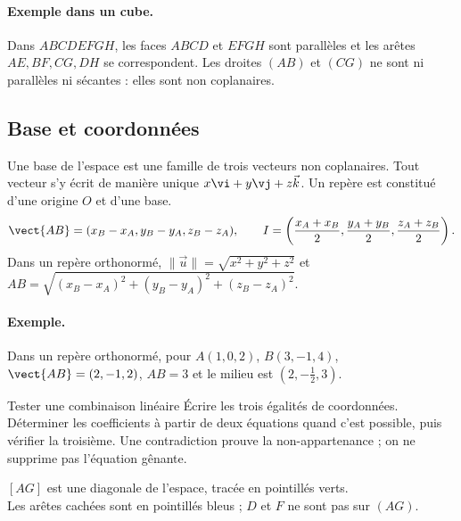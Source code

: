 \paragraph{Exemple dans un cube.} Dans $ABCDEFGH$, les faces $ABCD$ et $EFGH$ sont parallèles et les arêtes $AE,BF,CG,DH$ se correspondent. Les droites $(AB)$ et $(CG)$ ne sont ni parallèles ni sécantes : elles sont non coplanaires.
\subsection{Base et coordonnées}
Une base de l'espace est une famille de trois vecteurs non coplanaires. Tout vecteur s'y écrit de manière unique $x\vi +y\vj +z\vec k$. Un repère est constitué d'une origine $O$ et d'une base.
\[\vect{AB}=(x_B-x_A,y_B-y_A,z_B-z_A),\qquad
I=\left(\frac{x_A+x_B}2,\frac{y_A+y_B}2,\frac{z_A+z_B}2\right).\]
Dans un repère orthonormé, $\|\vec u\|=\sqrt{x^2+y^2+z^2}$ et $AB=\sqrt{(x_B-x_A)^2+(y_B-y_A)^2+(z_B-z_A)^2}$.
\paragraph{Exemple.} Dans un repère orthonormé, pour $A(1,0,2)$, $B(3,-1,4)$, $\vect{AB}=(2,-1,2)$, $AB=3$ et le milieu est $(2,-\frac{1}{2},3)$.
\begin{methode}{Tester une combinaison linéaire}
Écrire les trois égalités de coordonnées. Déterminer les coefficients à partir de deux équations quand c'est possible, puis vérifier la troisième. Une contradiction prouve la non-appartenance ; on ne supprime pas l'équation gênante.
\end{methode}


\begin{center}\par\small $[AG]$ est une diagonale de l'espace, tracée en pointillés verts.\\Les arêtes cachées sont en pointillés bleus ; $D$ et $F$ ne sont pas sur $(AG)$.\end{center}

